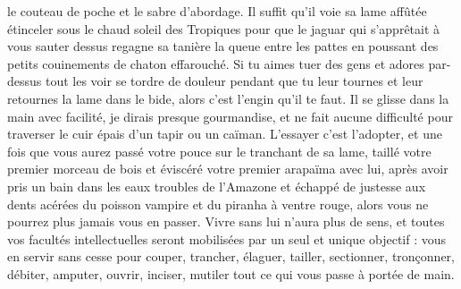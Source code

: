 le couteau de poche et le sabre d’abordage. Il suffit qu’il voie sa lame affûtée étinceler sous le chaud soleil des Tropiques pour que le jaguar qui s’apprêtait à vous sauter dessus regagne sa tanière la queue entre les pattes en poussant des petits couinements de chaton effarouché. Si tu aimes tuer des gens et adores par-dessus tout les voir se tordre de douleur pendant que tu leur tournes et leur retournes la lame dans le bide, alors c’est l’engin qu’il te faut. Il se glisse dans la main avec facilité, je dirais presque gourmandise, et ne fait aucune difficulté pour traverser le cuir épais d’un tapir ou un caïman. L’essayer c’est l’adopter, et une fois que vous aurez passé votre pouce sur le tranchant de sa lame, taillé votre premier morceau de bois et éviscéré votre premier arapaïma avec lui, après avoir pris un bain dans les eaux troubles de l’Amazone et échappé de justesse aux dents acérées du poisson vampire et du piranha à ventre rouge, alors vous ne pourrez plus jamais vous en passer. Vivre sans lui n’aura plus de sens, et toutes vos facultés intellectuelles seront mobilisées par un seul et unique objectif : vous en servir sans cesse pour couper, trancher, élaguer, tailler, sectionner, tronçonner, débiter, amputer, ouvrir, inciser, mutiler tout ce qui vous passe à portée de main.

